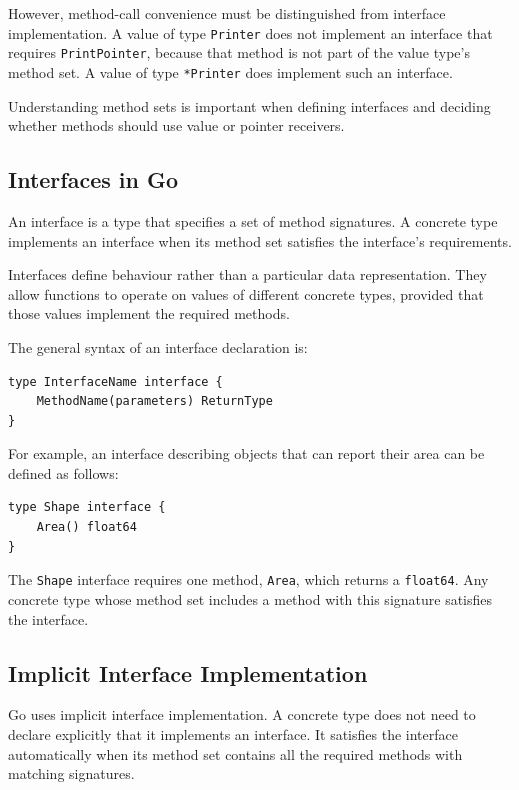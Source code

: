 However, method-call convenience must be distinguished from interface implementation. A value of type \texttt{Printer} does not implement an interface that requires \texttt{PrintPointer}, because that method is not part of the value type's method set. A value of type \texttt{*Printer} does implement such an interface.

Understanding method sets is important when defining interfaces and deciding whether methods should use value or pointer receivers.

\subsection{Interfaces in Go}

An interface is a type that specifies a set of method signatures. A concrete type implements an interface when its method set satisfies the interface's requirements.

Interfaces define behaviour rather than a particular data representation. They allow functions to operate on values of different concrete types, provided that those values implement the required methods.

The general syntax of an interface declaration is:

\begin{lstlisting}
type InterfaceName interface {
    MethodName(parameters) ReturnType
}
\end{lstlisting}

For example, an interface describing objects that can report their area can be defined as follows:

\begin{lstlisting}
type Shape interface {
    Area() float64
}
\end{lstlisting}

The \texttt{Shape} interface requires one method, \texttt{Area}, which returns a \texttt{float64}. Any concrete type whose method set includes a method with this signature satisfies the interface.

\subsection{Implicit Interface Implementation}

Go uses implicit interface implementation. A concrete type does not need to declare explicitly that it implements an interface. It satisfies the interface automatically when its method set contains all the required methods with matching signatures.

